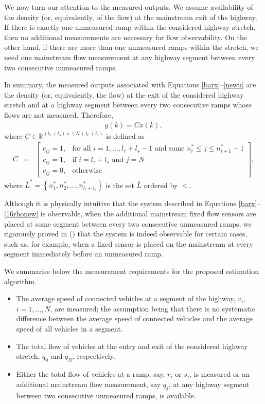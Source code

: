 \documentclass[titlepage,oneside,fleqn,12pt]{article}
\newcommand{\trbnum}[1]{{\it \citenum{#1}}}
\begin{document}
We now turn our attention to the measured outputs. We assume availability of the density (or, equivalently, of the flow) at the mainstream exit of the highway. If there is exactly one unmeasured ramp within the considered highway stretch, then no additional measurements are necessary for flow observability. On the other hand, if there are more than one unmeasured ramps within the stretch, we need one mainstream flow measurement at any highway segment between every two consecutive unmeasured ramps.  

In summary, the measured outputs associated with Equations \ref{barx}--\ref{newu} are the density (or, equivalently, the flow) at the exit of the considered highway stretch and at a highway segment between every two consecutive ramps whose flows are not measured. Therefore,
\begin{eqnarray}
{y}(k)={C}{x}(k),\label{newy}
\end{eqnarray} 
where ${C}\in\mathbb{R}^{(l_r+l_s)\times (N+l_r+l_s)}$ is defined as
\begin{eqnarray}
{C}&=&{\left[\begin{array}{ll}{c}_{ij}=1,&\mbox{for all $i=1,\ldots,l_r+l_s-1$ and some $n_i^*\leq j\leq n_{i+1}^*-1$}\\{c}_{ij}=1,&\mbox{if $i=l_r+l_s$ and $j=N$}\\{c}_{ij}=0,&\mbox{otherwise}\end{array}\right]},\label{16rhonew}
\end{eqnarray}
where $\bar{L}^*=\left\{n_1^*,n_2^*,\ldots,n_{l_r+l_s}^*\right\}$ is the set $\bar{L}$ ordered by $<$.

Although it is physically intuitive that the system described in Equations \ref{barx}--\ref{16rhonew} is observable, when the additional mainstream fixed flow sensors are placed at some segment between every two consecutive unmeasured ramps, we rigorously proved in (\trbnum{Bekiaris2015}) that the system is indeed observable for certain cases, such as, for example, when a fixed sensor is placed on the mainstream at every segment immediately before an unmeasured ramp.

We summarise below the measurement requirements for the proposed estimation algorithm.
\begin{itemize}
\item The average speed of connected vehicles at a segment of the highway, $v_i$, $i=1,\ldots,N$, are measured; the assumption being that there is no systematic  difference between the average speed of connected vehicles and the average speed of all vehicles in a segment.
\item The total flow of vehicles at the entry and exit of the considered highway stretch, $q_0$ and $q_N$, respectively.
\item Either the total flow of vehicles at a ramp, say, $r_i$ or $s_i$, is measured or an additional mainstream flow measurement, say $q_j$, at any highway segment between two consecutive unmeasured ramps, is available.
\end{itemize}
\end{document}
